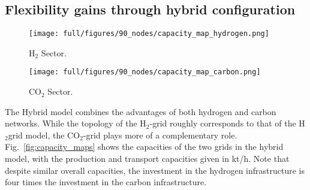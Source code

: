 \documentclass[twocolumn]{article}
\newcommand{\carbon}{CO$_2$}
\newcommand{\hydrogen}{H$_2$}
\begin{document}
\subsection*{Flexibility gains through hybrid configuration}

\begin{figure*}[ht!]
    \centering
    \begin{subfigure}{.49\textwidth}
        \centering
        \texttt{[image: full/figures/90\_nodes/capacity\_map\_hydrogen.png]}
        \caption{\hydrogen{} Sector.}
        \label{fig:capacity_map_hydrogen_co2}
    \end{subfigure}
    \hfill
    \begin{subfigure}{.49\textwidth}
        \centering
        \texttt{[image: full/figures/90\_nodes/capacity\_map\_carbon.png]}
        \caption{\carbon{} Sector.}
        \label{fig:capacity_map_carbon_co2}
    \end{subfigure}%
    \caption{Optimal production and transport capacities of the carbon and hydrogen sector in a net-zero energy system in Europe with both \carbon{} and \hydrogen{} network expansion (Hybrid).
    }
    \label{fig:capacity_maps}
\end{figure*}


The Hybrid model combines the advantages of both hydrogen and carbon networks. While the topology of the \hydrogen{}-grid roughly corresponds to that of the \hydrogen grid model, the \carbon{}-grid plays more of a complementary role. Fig.~\ref{fig:capacity_maps} shows the capacities of the two grids in the hybrid model, with the production and transport capacities given in kt/h. Note that despite similar overall capacities, the investment in the hydrogen infrastructure is four times the investment in the carbon infrastructure.
\end{document}
